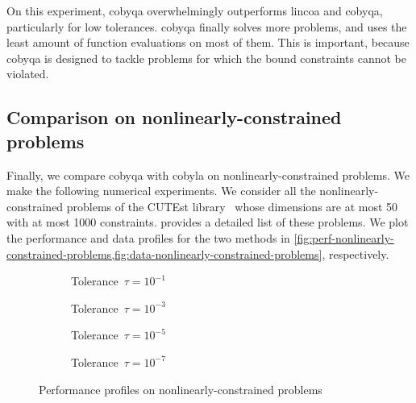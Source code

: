 On this experiment, \gls{cobyqa} overwhelmingly outperforms \gls{lincoa} and \gls{cobyqa}, particularly for low tolerances.
\gls{cobyqa} finally solves more problems, and uses the least amount of function evaluations on most of them.
This is important, because \gls{cobyqa} is designed to tackle problems for which the bound constraints cannot be violated.

\subsection{Comparison on nonlinearly-constrained problems}

Finally, we compare \gls{cobyqa} with \gls{cobyla} on nonlinearly-constrained problems.
We make the following numerical experiments.
We consider all the nonlinearly-constrained problems of the CUTEst library~\cite{Gould_Orban_Toint_2015} whose dimensions are at most \num{50} with at most \num[group-minimum-digits=4]{1000} constraints.
 provides a detailed list of these problems.
We plot the performance and data profiles for the two methods in \cref{fig:perf-nonlinearly-constrained-problems,fig:data-nonlinearly-constrained-problems}, respectively.

\begin{figure}[ht]
    \centering
    \begin{subfigure}[b]{0.49\textwidth}
        \centering
        \caption{Tolerance~$\tau = 10^{-1}$}
    \end{subfigure}
    \hfill
    \begin{subfigure}[b]{0.49\textwidth}
        \centering
        \caption{Tolerance~$\tau = 10^{-3}$}
    \end{subfigure}
    \begin{subfigure}[b]{0.49\textwidth}
        \centering
        \caption{Tolerance~$\tau = 10^{-5}$}
    \end{subfigure}
    \hfill
    \begin{subfigure}[b]{0.49\textwidth}
        \centering
        \caption{Tolerance~$\tau = 10^{-7}$}
    \end{subfigure}
    \caption{Performance profiles on nonlinearly-constrained problems}
    \label{fig:perf-nonlinearly-constrained-problems}
\end{figure}

